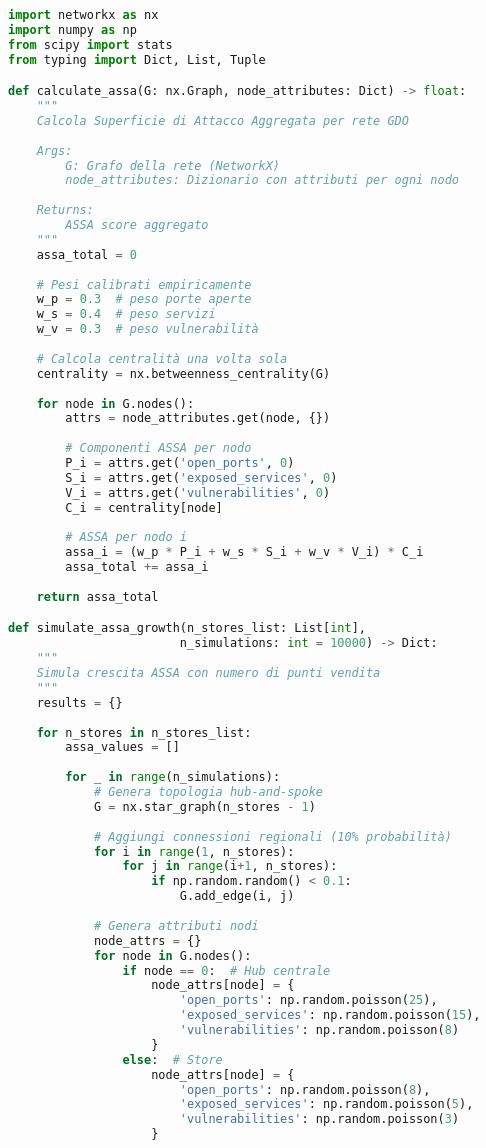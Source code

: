 \begin{lstlisting}[language=Python, caption=Calcolo ASSA per Reti GDO Distribuite]
import networkx as nx
import numpy as np
from scipy import stats
from typing import Dict, List, Tuple

def calculate_assa(G: nx.Graph, node_attributes: Dict) -> float:
    """
    Calcola Superficie di Attacco Aggregata per rete GDO
    
    Args:
        G: Grafo della rete (NetworkX)
        node_attributes: Dizionario con attributi per ogni nodo
        
    Returns:
        ASSA score aggregato
    """
    assa_total = 0
    
    # Pesi calibrati empiricamente
    w_p = 0.3  # peso porte aperte
    w_s = 0.4  # peso servizi
    w_v = 0.3  # peso vulnerabilità
    
    # Calcola centralità una volta sola
    centrality = nx.betweenness_centrality(G)
    
    for node in G.nodes():
        attrs = node_attributes.get(node, {})
        
        # Componenti ASSA per nodo
        P_i = attrs.get('open_ports', 0)
        S_i = attrs.get('exposed_services', 0)
        V_i = attrs.get('vulnerabilities', 0)
        C_i = centrality[node]
        
        # ASSA per nodo i
        assa_i = (w_p * P_i + w_s * S_i + w_v * V_i) * C_i
        assa_total += assa_i
    
    return assa_total

def simulate_assa_growth(n_stores_list: List[int], 
                        n_simulations: int = 10000) -> Dict:
    """
    Simula crescita ASSA con numero di punti vendita
    """
    results = {}
    
    for n_stores in n_stores_list:
        assa_values = []
        
        for _ in range(n_simulations):
            # Genera topologia hub-and-spoke
            G = nx.star_graph(n_stores - 1)
            
            # Aggiungi connessioni regionali (10% probabilità)
            for i in range(1, n_stores):
                for j in range(i+1, n_stores):
                    if np.random.random() < 0.1:
                        G.add_edge(i, j)
            
            # Genera attributi nodi
            node_attrs = {}
            for node in G.nodes():
                if node == 0:  # Hub centrale
                    node_attrs[node] = {
                        'open_ports': np.random.poisson(25),
                        'exposed_services': np.random.poisson(15),
                        'vulnerabilities': np.random.poisson(8)
                    }
                else:  # Store
                    node_attrs[node] = {
                        'open_ports': np.random.poisson(8),
                        'exposed_services': np.random.poisson(5),
                        'vulnerabilities': np.random.poisson(3)
                    }
            

\end{lstlisting}
